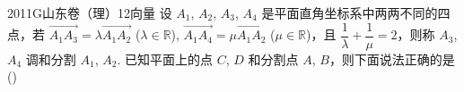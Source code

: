 
\begin{problem}{2011}{G}{山东卷（理）}{12}{向量}
设 $ A_1 $, $ A_2 $, $ A_3 $, $ A_4 $ 是平面直角坐标系中两两不同的四点，若 $ \overrightarrow{A_1A_3} = \lambda \overrightarrow{A_1A_2} $ ($ \lambda \in \mathbb{R} $), $ \overrightarrow{A_1A_4} = \mu \overrightarrow{A_1A_2} $ ($ \mu \in \mathbb{R} $)，且 $ \dfrac{1}{\lambda} + \dfrac{1}{\mu} = 2 $，则称 $ A_3 $, $ A_4 $ 调和分割 $ A_1 $, $ A_2 $. 已知平面上的点 $ C $, $ D $ 和分割点 $ A $, $ B $，则下面说法正确的是 (\hspace{1cm})
\begin{choices}
\end{choices}
\end{problem}

\begin{answer}

\end{answer}

\begin{solutions}

\end{solutions}